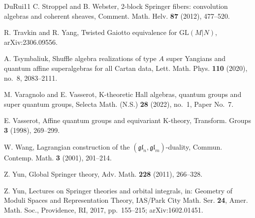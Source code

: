\documentclass[11pt,a4paper]{amsart}
\theoremstyle{definition}
\theoremstyle{remark}
\numberwithin{equation}{section}
\begin{document}
\begin{thebibliography}{DuRui11}
C. Stroppel and B. Webster,
2-block Springer fibers: convolution algebras and coherent sheaves,
Comment. Math. Helv. \textbf{87} (2012), 477--520.

R. Travkin and R. Yang,
Twisted Gaiotto equivalence for $\mathrm{GL}(M|N)$,
arXiv:2306.09556.

A. Tsymbaliuk,
Shuffle algebra realizations of type $A$ super Yangians and quantum affine
superalgebras for all Cartan data,
Lett. Math. Phys. \textbf{110} (2020), no.~8, 2083--2111.

M. Varagnolo and E. Vasserot,
K-theoretic Hall algebras, quantum groups and super quantum groups,
Selecta Math. (N.S.) \textbf{28} (2022), no.~1, Paper No.~7.

E. Vasserot,
Affine quantum groups and equivariant K-theory,
Transform. Groups \textbf{3} (1998), 269--299.

W. Wang,
Lagrangian construction of the $(\mathfrak{gl}_n,\mathfrak{gl}_m)$-duality,
Commun. Contemp. Math. \textbf{3} (2001), 201--214.

Z. Yun, Global Springer theory,
Adv. Math. \textbf{228} (2011), 266--328.

Z. Yun, Lectures on Springer theories and orbital integrals,
in: Geometry of Moduli Spaces and Representation Theory,
IAS/Park City Math. Ser. \textbf{24}, Amer. Math. Soc., Providence, RI,
2017, pp.~155--215; arXiv:1602.01451.
\end{thebibliography}
\end{document}
